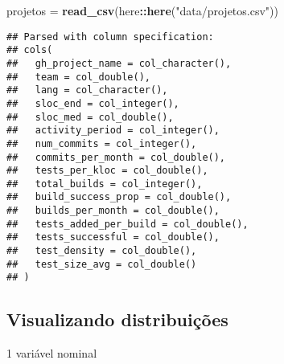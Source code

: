 \documentclass[]{article}
\newenvironment{Shaded}{\begin{snugshade}}{\end{snugshade}}
\newcommand{\KeywordTok}[1]{\textcolor[rgb]{0.13,0.29,0.53}{\textbf{#1}}}
\newcommand{\DataTypeTok}[1]{\textcolor[rgb]{0.13,0.29,0.53}{#1}}
\newcommand{\StringTok}[1]{\textcolor[rgb]{0.31,0.60,0.02}{#1}}
\newcommand{\OperatorTok}[1]{\textcolor[rgb]{0.81,0.36,0.00}{\textbf{#1}}}
\newcommand{\NormalTok}[1]{#1}
\begin{document}
\begin{Shaded}
\begin{Highlighting}[]
\NormalTok{projetos =}\StringTok{ }\KeywordTok{read_csv}\NormalTok{(here}\OperatorTok{::}\KeywordTok{here}\NormalTok{(}\StringTok{"data/projetos.csv"}\NormalTok{))}
\end{Highlighting}
\end{Shaded}

\begin{verbatim}
## Parsed with column specification:
## cols(
##   gh_project_name = col_character(),
##   team = col_double(),
##   lang = col_character(),
##   sloc_end = col_integer(),
##   sloc_med = col_double(),
##   activity_period = col_integer(),
##   num_commits = col_integer(),
##   commits_per_month = col_double(),
##   tests_per_kloc = col_double(),
##   total_builds = col_integer(),
##   build_success_prop = col_double(),
##   builds_per_month = col_double(),
##   tests_added_per_build = col_double(),
##   tests_successful = col_double(),
##   test_density = col_double(),
##   test_size_avg = col_double()
## )
\end{verbatim}

\begin{Shaded}
\end{Shaded}

\subsection{Visualizando
distribuições}\label{visualizando-distribuicoes}

1 variável nominal

\begin{Shaded}
\end{Shaded}
\end{document}
